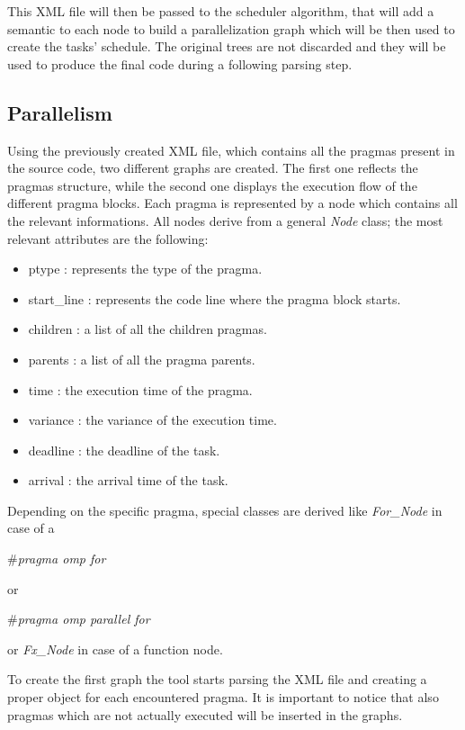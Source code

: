 \documentclass[a4paper,11pt,oneside]{book}
\begin{document}
This XML file will then be passed to the scheduler algorithm, that will add a semantic to each node to build a parallelization graph  which will be then used to create the tasks’ schedule. The original trees are not discarded and they will be used to produce the final code during a following parsing step.

\subsection{Parallelism}
\label{paralelism}

Using the previously created XML file, which contains all the pragmas present in the source code, two different graphs are created. The first one reflects the pragmas structure, while the second one displays the execution flow of the different pragma blocks. Each pragma is represented by a node which contains all the relevant informations. All nodes derive from a general \emph{Node} class; the most relevant attributes are the following:
\begin{itemize}
\item{ptype : represents the type of the pragma.}
\item{start\_line : represents the code line where the pragma block starts.}
\item{children : a list of all the children pragmas.}
\item{parents : a list of all the pragma parents.}
\item{time : the execution time of the pragma.}
\item{variance : the variance of the execution time.}
\item{deadline : the deadline of the task.}
\item{arrival : the arrival time of the task.}
\end{itemize}

Depending on the specific pragma, special classes are derived like \emph{For\_Node} in case of a \begin{bf}\emph{$\#$pragma omp for}\end{bf} or \begin{bf}\emph{$\#$pragma omp parallel for}\end{bf} or \emph{Fx\_Node} in case of a function node.

To create the first graph the tool starts parsing the XML file and creating a proper object for each encountered pragma. It is important to notice that also pragmas which are not actually executed will be inserted in the graphs. 
\end{document}
